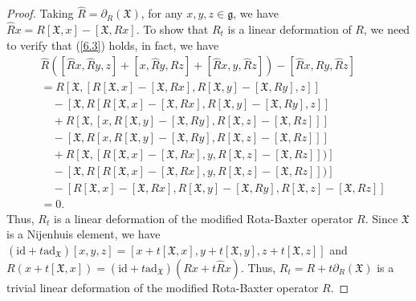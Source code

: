 \documentclass[12pt]{amsart}
\theoremstyle{definition}
\begin{document}
\begin{proof}
Taking $\hat{R}=\partial_R(\mathfrak{X})$, for any  $x, y,z \in \mathfrak{g}$, we have  $\hat{R}x=R[\mathfrak{X},x]-[\mathfrak{X},Rx].$ To show that $ R_t$ is a linear deformation of $R$, we need to
 verify that (\ref{6.3}) holds, in fact, we have
 \begin{align*}
&\hat{R}( [\hat{R}x, \hat{R}y, z]+[x, \hat{R}y, \hat{R}z]+[\hat{R}x, y, \hat{R}z])-[\hat{R}x, \hat{R}y, \hat{R}z]\\
&=R[\mathfrak{X},[R[\mathfrak{X},x]-[\mathfrak{X},Rx], R[\mathfrak{X},y]-[\mathfrak{X},Ry], z]]\\
&\quad-[\mathfrak{X},R[R[\mathfrak{X},x]-[\mathfrak{X},Rx], R[\mathfrak{X},y]-[\mathfrak{X},Ry], z]]\\
&\quad+R[\mathfrak{X},[x, R[\mathfrak{X},y]-[\mathfrak{X},Ry], R[\mathfrak{X},z]-[\mathfrak{X},Rz]]]\\
&\quad-[\mathfrak{X},R[x, R[\mathfrak{X},y]-[\mathfrak{X},Ry], R[\mathfrak{X},z]-[\mathfrak{X},Rz]]]\\
&\quad+R[\mathfrak{X},[R[\mathfrak{X},x]-[\mathfrak{X},Rx], y, R[\mathfrak{X},z]-[\mathfrak{X},Rz]])]\\
&\quad-[\mathfrak{X},R[R[\mathfrak{X},x]-[\mathfrak{X},Rx], y, R[\mathfrak{X},z]-[\mathfrak{X},Rz]])]\\
&\quad-[R[\mathfrak{X},x]-[\mathfrak{X},Rx], R[\mathfrak{X},y]-[\mathfrak{X},Ry], R[\mathfrak{X},z]-[\mathfrak{X},Rz]]\\
&=0.
\end{align*}
 Thus, $ R_t$ is a linear deformation of the modified Rota-Baxter operator $R$. Since $\mathfrak{X}$ is a
 Nijenhuis element, we have $(\mathrm{id}+t\mathrm{ad}_{\mathfrak{X}})[x, y, z]=[x+t[\mathfrak{X}, x], y+t[\mathfrak{X}, y], z+t[\mathfrak{X}, z]]$ and $
R(x + t[\mathfrak{X}, x]) =(\mathrm{id}+t\mathrm{ad}_{\mathfrak{X}})(Rx+t\hat{R}x)$. Thus,   $R_t =R+t\partial_R(\mathfrak{X})$ is a trivial linear
 deformation of the modified Rota-Baxter operator $R$.
\end{proof}
\end{document}
